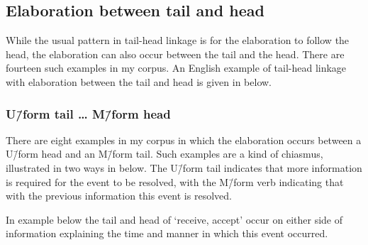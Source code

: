 \subsection{Elaboration between tail and head}\label{sec:ElaTaiHea}
While the usual pattern in tail-head linkage
is for the elaboration to follow the head,
the elaboration can also occur between the tail and the head.
There are fourteen such examples in my corpus.
An English example of tail-head linkage with elaboration
between the tail and head is given in  below.

\begin{exe}\let\eachwordone=\p
	\label{ex:EngTaiHeaMed}
\end{exe}

\subsubsection{U\=/form tail {\ldots} M\=/form head}
There are eight examples in my corpus in which the elaboration
occurs between a U\=/form head and an M\=/form tail.
Such examples are a kind of chiasmus,
illustrated in two ways in  below.
The U\=/form tail indicates that more information
is required for the event to be resolved,
with the M\=/form verb indicating that with the
previous information this event is resolved.

\begin{exe}
	\label{ex:ChiTaiHeaLin}
		\begin{xlist}
		\end{xlist}
\end{exe}

In example  below the tail and head
of  `receive, accept' occur on either side of information
explaining the time and manner in which this event occurred.

